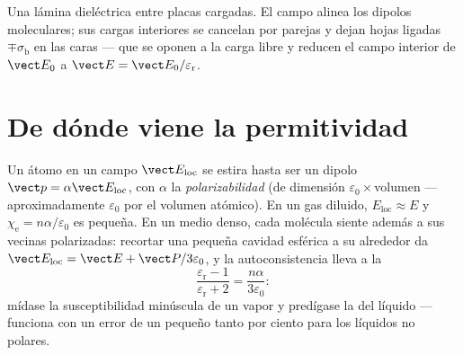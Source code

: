 \begin{omfigure}

{\small Una lámina dieléctrica entre placas cargadas. El campo alinea
los dipolos moleculares; sus cargas interiores se cancelan por parejas y dejan
hojas ligadas $\mp\sigma_{\text{b}}$ en las caras --- que se oponen a la
carga libre y reducen el campo interior de $\vect E_0$ a
$\vect E = \vect E_0/\varepsilon_{\text{r}}$.}
\end{omfigure}

\section{De dónde viene la permitividad}

\begin{proposition}\label{prop:b3:electromagnetism-in-matter:mossotti}
Un átomo en un campo $\vect E_{\text{loc}}$ se estira hasta ser un dipolo
$\vect p = \alpha\vect E_{\text{loc}}$, con $\alpha$ la
\emph{polarizabilidad} (de dimensión $\varepsilon_0\times$volumen ---
aproximadamente $\varepsilon_0$ por el volumen atómico). En un gas diluido,
$E_{\text{loc}} \approx E$ y $\chi_{\text{e}} =
n\alpha/\varepsilon_0$ es pequeña. En un medio denso, cada molécula siente además
a sus vecinas polarizadas: recortar una pequeña cavidad esférica
a su alrededor da $\vect E_{\text{loc}} = \vect E + \vect
P/3\varepsilon_0$, y la autoconsistencia lleva a la
\emph{}
\[
\frac{\varepsilon_{\text{r}} - 1}{\varepsilon_{\text{r}} + 2}
= \frac{n\alpha}{3\varepsilon_0} :
\]
mídase la susceptibilidad minúscula de un vapor y predígase la del líquido ---
funciona con un error de un pequeño tanto por ciento para los líquidos no polares.
\end{proposition}
\admitted

